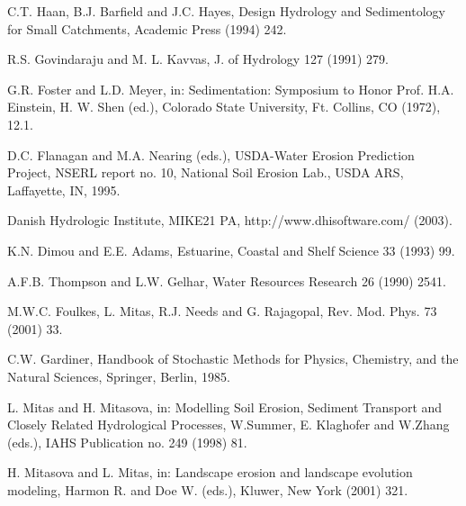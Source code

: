 \documentclass[fleqn,12pt,twoside]{article}
\begin{document}
\begin{thebibliography}{9}
C.T. Haan, B.J. Barfield and J.C. Hayes, 
Design Hydrology and Sedimentology for Small Catchments,
Academic Press (1994) 242.

R.S. Govindaraju and M. L. Kavvas, 
J. of Hydrology 127 (1991) 279.

G.R. Foster and L.D. Meyer, 
in: Sedimentation: Symposium to Honor Prof. H.A. Einstein,
 H. W. Shen (ed.), Colorado State University, Ft. Collins, CO (1972), 12.1.

D.C. Flanagan and M.A. Nearing (eds.),
USDA-Water Erosion Prediction Project,
 NSERL report no. 10, National Soil Erosion Lab.,
USDA ARS, Laffayette, IN, 1995.


Danish Hydrologic Institute, MIKE21 PA, http://www.dhisoftware.com/ (2003).

K.N. Dimou and E.E. Adams, 
Estuarine, Coastal and Shelf Science 33 (1993) 99.

A.F.B. Thompson and L.W. Gelhar, 
Water Resources Research 26 (1990) 2541.

M.W.C. Foulkes, L. Mitas, R.J. Needs and G. Rajagopal, 
Rev. Mod. Phys. 73 (2001) 33.

C.W. Gardiner, Handbook of Stochastic Methods for Physics,
Chemistry, and the Natural Sciences, Springer, Berlin, 1985.

L. Mitas and H.  Mitasova, 
in: Modelling Soil Erosion, Sediment Transport and Closely Related Hydrological Processes,
W.Summer, E. Klaghofer and W.Zhang (eds.), IAHS Publication no. 249 (1998) 81.


H. Mitasova and L. Mitas, 
in: Landscape erosion and landscape evolution modeling, Harmon R. and Doe W. (eds.), 
Kluwer, New York (2001) 321.

\end{thebibliography}

%
%
\end{document}
